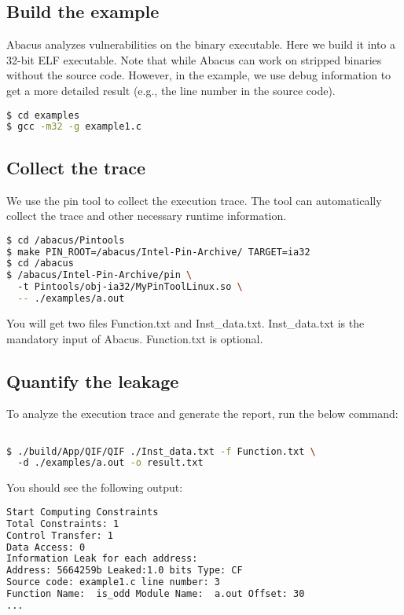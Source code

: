 \documentclass[10pt,conference]{IEEEtran}
\newcommand{\tool}{\textsf{Abacus}}
\begin{document}
\subsection{Build the example}

Abacus analyzes vulnerabilities on the binary executable. Here we build it into  a 32-bit ELF executable. Note that while Abacus can work on stripped binaries without the source code. However, in the example, we use debug information to get a more detailed result (e.g., the line number in the source code).
\begin{lstlisting}[language=bash]
$ cd examples
$ gcc -m32 -g example1.c
\end{lstlisting}


\subsection{Collect the trace}
We use the pin tool to collect the execution trace. The tool can automatically collect the trace and other necessary runtime information.
\begin{lstlisting}[language=bash]
$ cd /abacus/Pintools
$ make PIN_ROOT=/abacus/Intel-Pin-Archive/ TARGET=ia32
$ cd /abacus
$ /abacus/Intel-Pin-Archive/pin \ 
  -t Pintools/obj-ia32/MyPinToolLinux.so \
  -- ./examples/a.out 
\end{lstlisting}

You will get two files \textsf{Function.txt} and \textsf{Inst\_data.txt}. \textsf{Inst\_data.txt} is the mandatory input of \tool{}. \textsf{Function.txt} is optional. 

\subsection{Quantify the leakage}
To analyze the execution trace and generate the report, run the below command:
\begin{lstlisting}[language=bash]

$ ./build/App/QIF/QIF ./Inst_data.txt -f Function.txt \ 
  -d ./examples/a.out -o result.txt
\end{lstlisting}

You should see the following output:

\begin{lstlisting}[language=bash]
Start Computing Constraints
Total Constraints: 1
Control Transfer: 1
Data Access: 0
Information Leak for each address:
Address: 5664259b Leaked:1.0 bits Type: CF  
Source code: example1.c line number: 3
Function Name:  is_odd Module Name:  a.out Offset: 30
...
\end{lstlisting}
\end{document}
